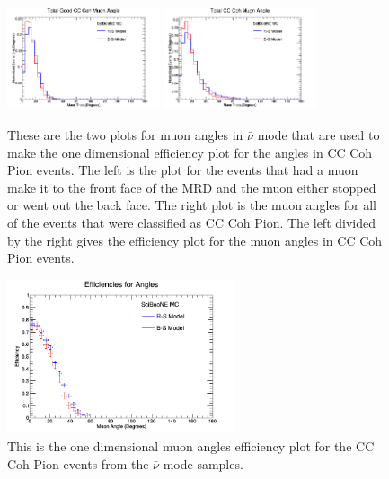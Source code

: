 \documentclass[11pt]{article}
\begin{document}
\begin{figure}[H]
\centering
\includegraphics[width=0.4\textwidth]{ANMCombinedPlotsImages/11-ANMCombinedPlots.png}
\includegraphics[width=0.4\textwidth]{ANMCombinedPlotsImages/13-ANMCombinedPlots.png}
\caption{These are the two plots for muon angles in $\bar{\nu}$ mode that are used to make the one dimensional efficiency plot for the angles in CC Coh Pion events. The left is the plot for the events that had a muon make it to the front face of the MRD and the muon either stopped or went out the back face. The right plot is the muon angles for all of the events that were classified as CC Coh Pion. The left divided by the right gives the efficiency plot for the muon angles in CC Coh Pion events.}
\end{figure}

\begin{figure}[H]
\centering
\includegraphics[width=0.6\textwidth]{ANMCombinedPlotsImages/17-ANMCombinedPlots.png}
\caption{This is the one dimensional muon angles efficiency plot for the CC Coh Pion events from the $\bar{\nu}$ mode samples.}
\end{figure}
\end{document}
